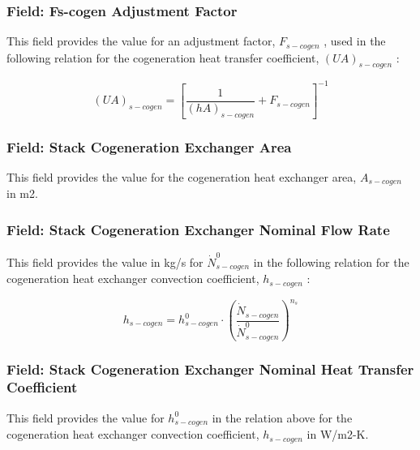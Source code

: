 \subsubsection{Field: Fs-cogen Adjustment Factor}\label{field-fs-cogen-adjustment-factor}

This field provides the value for an adjustment factor, \({F_{s - cogen}}\) , used in the following relation for the cogeneration heat transfer coefficient, \({\left( {UA} \right)_{s - cogen}}\) :

\begin{equation}
{\left( {UA} \right)_{s - cogen}} = {\left[ {\frac{1}{{{{\left( {hA} \right)}_{s - cogen}}}} + {F_{s - cogen}}} \right]^{ - 1}}
\end{equation}

\subsubsection{Field: Stack Cogeneration Exchanger Area}\label{field-stack-cogeneration-exchanger-area}

This field provides the value for the cogeneration heat exchanger area, \({A_{s - cogen}}\) in m2.

\subsubsection{Field: Stack Cogeneration Exchanger Nominal Flow Rate}\label{field-stack-cogeneration-exchanger-nominal-flow-rate}

This field provides the value in kg/s for \(\dot N_{s - cogen}^0\) in the following relation for the cogeneration heat exchanger convection coefficient, \({h_{s - cogen}}\) :

\begin{equation}
{h_{s - cogen}} = h_{s - cogen}^0 \cdot {\left( {\frac{{{{\dot N}_{s - cogen}}}}{{\dot N_{s - cogen}^0}}} \right)^{{n_s}}}
\end{equation}

\subsubsection{Field: Stack Cogeneration Exchanger Nominal Heat Transfer Coefficient}\label{field-stack-cogeneration-exchanger-nominal-heat-transfer-coefficient}

This field provides the value for \(h_{s - cogen}^0\) in the relation above for the cogeneration heat exchanger convection coefficient, \({h_{s - cogen}}\) in W/m2-K.

